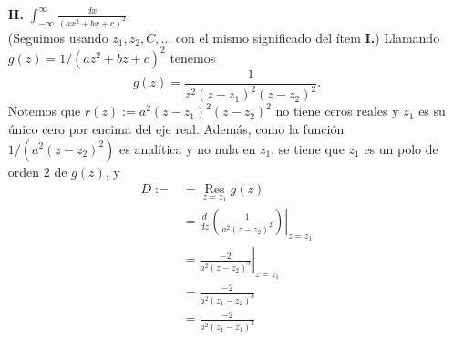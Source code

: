 {\begin{itemize}
$$         $$
         Por el criterio de la integral, $\int_{0}^{\infty}f(x)dx$ converge si y solo si $\sum_{n=0}^{\infty}f(n)$ converge, pero vemos que esto es cierto haciendo comparación del límite con la serie convergente $\sum_{n=1}^{\infty}1/(an^2)$. Por tanto, $\lim_{R\to\infty}\int_{0}^{R}f(x)dx$ converge; como $\lim_{R\to\infty}\left( \int_{-R}^{0}f(x)dx+\int_{0}^{R}f(x)dx\right)$ converge, también lo hace $\lim_{R\to\infty}\int_{-R}^{0}f(x)dx$, de modo que
         $$
         \begin{aligned}
            \lim_{R\to\infty}\left( \int_{-R}^{0}f(x)dx+\int_{0}^{R}f(x)dx\right)&=\lim_{R\to\infty}\int_{-R}^{0}f(x)dx+\lim_{R\to\infty}\int_{0}^{\infty}f(x)dx\\
                                                                                               &=\int_{-\infty}^{\infty} f(x)dx,
         \end{aligned}
         $$
         y por tanto
         $$
         \begin{aligned}
            \int_{-\infty}^{\infty}f(x)dx&=2\pi i B\\
                                         &=2\pi i\cdot\sgn(a)\frac{1}{i\sqrt{4ac-b^2}}\\
                                         &=\sgn(a)\frac{2\pi}{\sqrt{4ac-b^2}}.
         \end{aligned}
         $$
      \item[\textbf{II.}] $\int_{-\infty}^{\infty} \frac{dx}{(ax^2+bx+c)^2}$\\
         (Seguimos usando $z_1,z_2,C,\dots$ con el mismo significado del ítem \textbf{I.}) Llamando $g(z)=1/(az^2+bz+c)^2$ tenemos
         $$
         g(z)=\frac{1}{z^2(z-z_1)^2(z-z_2)^2}.
         $$
         Notemos que $r(z):=a^2(z-z_1)^2(z-z_2)^2$ no tiene ceros reales y $z_1$ es su único cero por encima del eje real. Además, como la función $1/(a^2(z-z_2)^2)$ es analítica y no nula en $z_1$, se tiene que $z_1$ es un polo de orden $2$ de $g(z)$, y
         $$
         \begin{aligned}
            D:=&=\mathop{\mathrm{Res}}\limits_{z=z_1}g(z)\\
               &=\frac{d}{dz}\left.\left( \frac{1}{a^2(z-z_2)^2}\right)\right|_{z=z_1}\\
               &=\left. \frac{-2}{a^2(z-z_2)^3}\right|_{z=z_1}\\
               &=\frac{-2}{a^2(z_1-z_2)^3}\\
               &=\frac{-2}{a^2(z_1-\overline{z_1})^3}\\

\end{aligned}$$
\end{itemize}}
